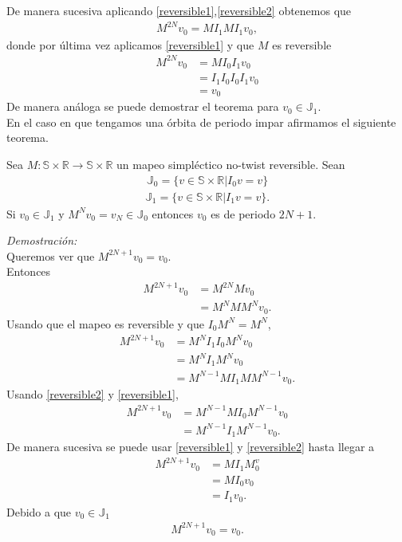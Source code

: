 De manera sucesiva aplicando \ref{reversible1},\ref{reversible2} obtenemos que 
\begin{align*}
		M^{2N}v_{0}=MI_{1}MI_{1}v_{0},
\end{align*} 
donde por \'ultima vez aplicamos \ref{reversible1} y que $M$ es reversible
\begin{align*}
M^{2N}v_{0}&=MI_{0}I_{1}v_{0}\\
			&= I_{1}I_{0}I_{0}I_{1}v_{0}\\
			&=v_{0}
\end{align*}
De manera an\'aloga se puede demostrar el teorema para $v_{0}\in \mathbb{J}_{1}$.\\

En el caso en que tengamos una \'orbita de periodo impar afirmamos el siguiente teorema. 

\begin{thm}
	Sea $M:\mathbb{S} \times \mathbb{R} \longrightarrow \mathbb{S}\times\mathbb{R}$ un mapeo simpl\'ectico no-twist reversible. Sean 
	\begin{eqnarray}
	\mathbb{J}_{0} = \{v \in \mathbb{S} \times \mathbb{R} | I_{0}v = v\}
	\end{eqnarray}
	\begin{eqnarray}
	\mathbb{J}_{1} = \{v \in \mathbb{S} \times \mathbb{R} | I_{1}v = v\}.
	\end{eqnarray}
	Si $v_{0}\in \mathbb{J}_{1}$ y $M^{N}v_{0}=v_{N}\in \mathbb{J}_{0}$ entonces $v_{0}$ es de periodo $2N+1$.
\end{thm}

\textit{Demostraci\'on:}\\
Queremos ver que $M^{2N+1}v_{0}=v_{0}$.\\
Entonces
\begin{align*}
M^{2N+1}v_{0} &= M^{2N}Mv_{0}\\
			&= M^{N}MM^{N}v_{0}.
\end{align*}
Usando que el mapeo es reversible y que $I_{0}M^{N}=M^{N}$,
\begin{align*}
M^{2N+1}v_{0} &= M^{N}I_{1}I_{0}M^{N}v_{0}\\
				&= M^{N}I_{1}M^{N}v_{0}\\
				&= M^{N-1}MI_{1}MM^{N-1}v_{0}.
\end{align*}
Usando \ref{reversible2} y \ref{reversible1},
\begin{align*}
M^{2N+1}v_{0} &= M^{N-1}MI_{0}M^{N-1}v_{0}\\
				&= M^{N-1}I_{1}M^{N-1}v_{0}.
\end{align*}
De manera sucesiva se puede usar \ref{reversible1} y \ref{reversible2} hasta llegar a 
\begin{align*}
M^{2N+1}v_{0} &= MI_{1}M^v_{0}\\
			&= MI_{0}v_{0}\\
			&= I_{1}v_{0}.
\end{align*}
Debido a que $v_{0}\in \mathbb{J}_{1}$ 
\begin{align*}
M^{2N+1}v_{0} = v_{0}.
\end{align*}

